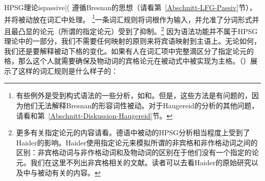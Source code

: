 HPSG理论is{passive|(} 遵循Bresnan的思想（请看第~\ref{Abschnitt-LFG-Passiv}节），并将被动放在词汇中处理。
\footnote{
有些例外是受到构式语法的一些分析，如\citet{Tseng2007a}和\citet{Haugereid2007a}。但是，这些方法是有问题的，因为他们无法解释Bresnan的形容词性被动。对于Haugereid的分析的其他问题，请看和第~\ref{Abschnitt-Diskussion-Haugereid}节。
}一条词汇规则将词根作为输入，并允准了分词形式并且最凸显的论元（所谓的指定论元）受到了抑制。\footnote{
更多有关指定论元的内容请看。德语中被动的HPSG分析相当程度上受到了Haider的影响。Haider使用指定论元来模拟所谓的非宾格和非作格动词之间的区别\citep{Perlmutter78}：非宾格动词与非作格动词和及物动词的区别在于他们没有一个指定的论元。我们在这里不列出非宾格相关的文献。读者可以去看Haider的原始研究以及中与被动有关的内容。
}
因为语法功能并不属于HPSG理论中的一部分，我们不需要任何映射的原则来将宾语映射到主语上。无论如何，我们还是要解释被动下格的变化。如果有人在词汇项中完整滴区分了指定论元的格，那么这个人就需要确保及物动词的宾格论元在被动式中被实现为主格。（）展示了这样的词汇规则是什么样子的：

